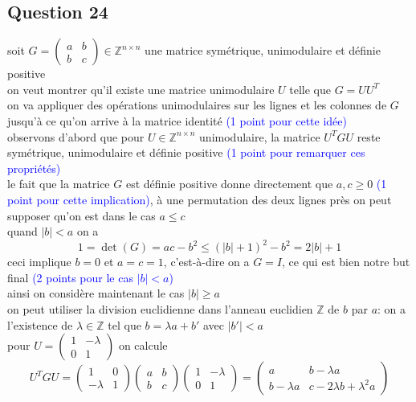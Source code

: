 \documentclass[11pt, a4paper, oneside]{article}
\begin{document}
\newpage

\subsection*{Question 24}
soit $G=\begin{pmatrix} a & b \\ b & c\end{pmatrix} \in \mathbb{Z}^{n \times n}$ une matrice symétrique, unimodulaire et définie positive \\
on veut montrer qu'il existe une matrice unimodulaire $U$ telle que $G = UU^T$ \\
on va appliquer des opérations unimodulaires sur les lignes et les colonnes de $G$ jusqu'à ce qu'on arrive à la matrice identité \textcolor{blue}{(1 point pour cette idée)} \\
observons d'abord que pour $U \in \mathbb{Z}^{n \times n}$ unimodulaire, la matrice $U^TGU$ reste symétrique, unimodulaire et définie positive \textcolor{blue}{(1 point pour remarquer ces propriétés)} \\
le fait que la matrice $G$ est définie positive donne directement que $a,c \geq 0$ \textcolor{blue}{(1 point pour cette implication)}, {\tiny à une permutation des deux lignes près} on peut supposer qu'on est dans le cas $a \leq c$ \\
quand $|b|<a$ on a $$1=\det(G)=ac-b^2\leq(|b|+1)^2-b^2=2|b|+1$$ ceci implique $b=0$ et $a=c=1$, c'est-à-dire on a $G=I$, {\tiny ce qui est bien notre but final} \textcolor{blue}{(2 points pour le cas $|b|<a$)} \\
ainsi on considère maintenant le cas $|b|\geq a$ \\
{\tiny on peut utiliser la division euclidienne dans l'anneau euclidien $\mathbb{Z}$ de $b$ par $a$:} on a l'existence de $\lambda \in \mathbb{Z}$ tel que $b=\lambda a + b'$ avec $|b'|<a$ \\
pour $U = \begin{pmatrix} 1 & -\lambda \\ 0 & 1 \end{pmatrix}$ on calcule 
$$U^TGU = \begin{pmatrix} 1 & 0 \\ -\lambda & 1 \end{pmatrix} \begin{pmatrix} a & b \\ b & c\end{pmatrix} \begin{pmatrix} 1 & -\lambda \\ 0 & 1 \end{pmatrix} = \begin{pmatrix} a & b-\lambda a \\ b-\lambda a & c-2\lambda b + \lambda^2a \end{pmatrix}$$
\end{document}
